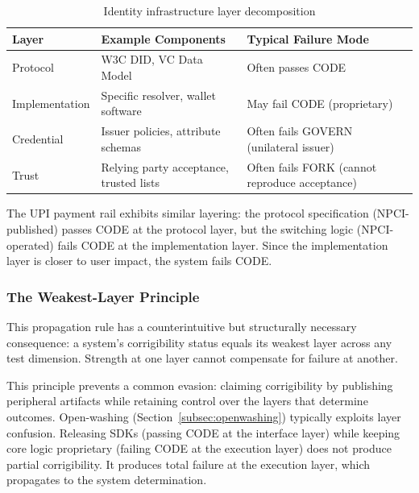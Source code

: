 \begin{table}[htbp]
\centering
\small
\begin{tabular}{@{}llp{5cm}@{}}
\toprule
\textbf{Layer} & \textbf{Example Components} & \textbf{Typical Failure Mode} \\
\midrule
Protocol & W3C DID, VC Data Model & Often passes CODE \\
Implementation & Specific resolver, wallet software & May fail CODE (proprietary) \\
Credential & Issuer policies, attribute schemas & Often fails GOVERN (unilateral issuer) \\
Trust & Relying party acceptance, trusted lists & Often fails FORK (cannot reproduce acceptance) \\
\bottomrule
\end{tabular}
\caption{Identity infrastructure layer decomposition}
\label{tab:identity_layers}
\end{table}

The UPI payment rail exhibits similar layering: the protocol specification (NPCI-published) passes CODE at the protocol layer, but the switching logic (NPCI-operated) fails CODE at the implementation layer. Since the implementation layer is closer to user impact, the system fails CODE.

\subsubsection{The Weakest-Layer Principle}

This propagation rule has a counterintuitive but structurally necessary consequence: a system's corrigibility status equals its weakest layer across any test dimension. Strength at one layer cannot compensate for failure at another.

This principle prevents a common evasion: claiming corrigibility by publishing peripheral artifacts while retaining control over the layers that determine outcomes. Open-washing (Section~\ref{subsec:openwashing}) typically exploits layer confusion. Releasing SDKs (passing CODE at the interface layer) while keeping core logic proprietary (failing CODE at the execution layer) does not produce partial corrigibility. It produces total failure at the execution layer, which propagates to the system determination.